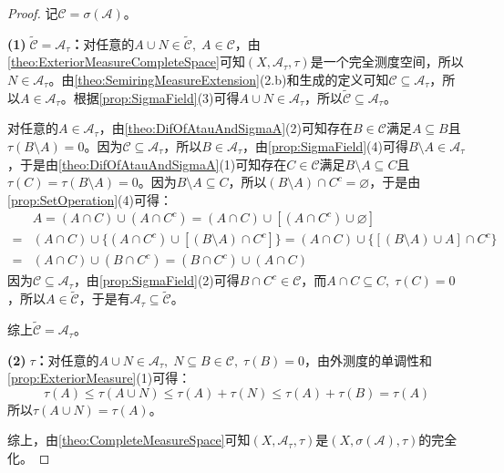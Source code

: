\begin{proof}
	记$\mathscr{C}=\sigma(\mathscr{A})$。\par
	\textbf{(1)$\;\tilde{\mathscr{C}}=\mathscr{A}_\tau$：}对任意的$A\cup N\in\tilde{\mathscr{C}},\;A\in\mathscr{C}$，由\cref{theo:ExteriorMeasureCompleteSpace}可知$(X,\mathscr{A}_\tau,\tau)$是一个完全测度空间，所以$N\in\mathscr{A}_\tau$。由\cref{theo:SemiringMeasureExtension}(2.b)和生成的定义可知$\mathscr{C}\subseteq\mathscr{A}_\tau$，所以$A\in\mathscr{A}_\tau$。根据\cref{prop:SigmaField}(3)可得$A\cup N\in\mathscr{A}_\tau$，所以$\tilde{\mathscr{C}}\subseteq\mathscr{A}_\tau$。\par
	对任意的$A\in\mathscr{A}_\tau$，由\cref{theo:DifOfAtauAndSigmaA}(2)可知存在$B\in\mathscr{C}$满足$A\subseteq B$且$\tau(B\setminus A)=0$。因为$\mathscr{C}\subseteq\mathscr{A}_\tau$，所以$B\in\mathscr{A}_\tau$，由\cref{prop:SigmaField}(4)可得$B\setminus A\in\mathscr{A}_\tau$，于是由\cref{theo:DifOfAtauAndSigmaA}(1)可知存在$C\in\mathscr{C}$满足$B\setminus A\subseteq C$且$\tau(C)=\tau(B\setminus A)=0$。因为$B\setminus A\subseteq C$，所以$(B\setminus A)\cap C^c=\varnothing$，于是由\cref{prop:SetOperation}(4)可得：
	\begin{align*}
		&A=(A\cap C)\cup(A\cap C^c)=(A\cap C)\cup[(A\cap C^c)\cup\varnothing] \\
		=&(A\cap C)\cup\{(A\cap C^c)\cup[(B\setminus A)\cap C^c]\}=(A\cap C)\cup\{[(B\setminus A)\cup A]\cap C^c\} \\
		=&(A\cap C)\cup(B\cap C^c)=(B\cap C^c)\cup(A\cap C)
	\end{align*}
	因为$\mathscr{C}\subseteq\mathscr{A}_\tau$，由\cref{prop:SigmaField}(2)可得$B\cap C^c\in\mathscr{C}$，而$A\cap C\subseteq C,\;\tau(C)=0$，所以$A\in\tilde{\mathscr{C}}$，于是有$\mathscr{A}_\tau\subseteq\tilde{\mathscr{C}}$。\par
	综上$\tilde{\mathscr{C}}=\mathscr{A}_\tau$。\par
	\textbf{(2)$\;\tau$：}对任意的$A\cup N\in\mathscr{A}_\tau,\;N\subseteq B\in\mathscr{C},\;\tau(B)=0$，由外测度的单调性和\cref{prop:ExteriorMeasure}(1)可得：
	\begin{equation*}
		\tau(A)\leqslant\tau(A\cup N)\leqslant\tau(A)+\tau(N)\leqslant\tau(A)+\tau(B)=\tau(A)
	\end{equation*}
	所以$\tau(A\cup N)=\tau(A)$。\par
	综上，由\cref{theo:CompleteMeasureSpace}可知$(X,\mathscr{A}_\tau,\tau)$是$(X,\sigma(\mathscr{A}),\tau)$的完全化。
\end{proof}

